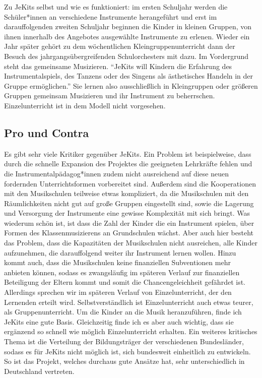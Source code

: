 Zu JeKits selbst und wie es funktioniert: im ersten Schuljahr werden die
Schüler*innen an verschiedene Instrumente herangeführt und erst im
darauffolgenden zweiten Schuljahr beginnen die Kinder in kleinen Gruppen, von
ihnen innerhalb des Angebotes ausgewählte Instrumente zu erlenen. Wieder ein
Jahr später gehört zu dem wöchentlichen Kleingruppenunterricht dann der Besuch
des jahrgangsübergreifenden Schulorchesters mit dazu. Im Vordergrund steht das
gemeinsame Musizieren. \enquote{JeKits will Kindern die Erfahrung des
Instrumentalspiels, des Tanzens oder des Singens als ästhetisches Handeln in der
Gruppe ermöglichen.}
\autocite{https://de.wikipedia.org/wiki/JeKits}
Sie lernen also ausschließlich in Kleingruppen oder größeren Gruppen gemeinsam
Musizieren und ihr Instrument zu beherrschen. Einzelunterricht ist in dem Modell
nicht vorgesehen.


\subsection{Pro und Contra}
Es gibt sehr viele Kritiker gegenüber JeKits. Ein Problem ist beispielweise,
dass durch die schnelle Expansion des Projektes die geeigneten Lehrkräfte fehlen
und die Instrumentalpädagog*innen zudem nicht ausreichend auf diese neuen
fordernden Unterrichtsformen vorbereitet sind. Außerdem sind die Kooperationen
mit den Musikschulen teilweise etwas kompliziert, da die Musikschulen mit den
Räumlichkeiten nicht gut auf große Gruppen eingestellt sind, sowie die Lagerung
und Versorgung der Instrumente eine gewisse Komplexität mit sich bringt. Was
wiederum schön ist, ist dass die Zahl der Kinder die ein Instrument spielen,
über Formen des Klassenmusizierens an Grundschulen wächst.
\autocite[119]{ernst:die_zukunftsfaehige_musikschule} Aber auch hier besteht das
Problem, dass die Kapazitäten der Musikschulen nicht ausreichen, alle Kinder
aufzunehmen, die darauffolgend weiter ihr Instrument lernen wollen. Hinzu kommt
auch, dass die Musikschulen keine finanziellen Subventionen mehr anbieten
können, sodass es zwangsläufig im späteren Verlauf zur finanziellen Beteiligung
der Eltern kommt und somit die Chancengeleichheit gefährdet ist. Allerdings
sprechen wir im späteren Verlauf von Einzelunterricht, der den Lernenden erteilt
wird. Selbstverständlich ist Einzelunterricht auch etwas teurer, als
Gruppenunterricht. Um die Kinder an die Musik heranzuführen, finde ich JeKits
eine gute Basis. Gleichzeitig finde ich es aber auch wichtig, dass sie ergänzend
so schnell wie möglich Einzelunterricht erhalten. Ein weiteres kritisches Thema
ist die Verteilung der Bildungsträger der verschiedenen Bundesländer, sodass es
für JeKits nicht möglich ist, sich bundesweit einheitlich zu entwickeln. So ist
das Projekt, welches durchaus gute Ansätze hat, sehr unterschiedlich in
Deutschland vertreten. 
